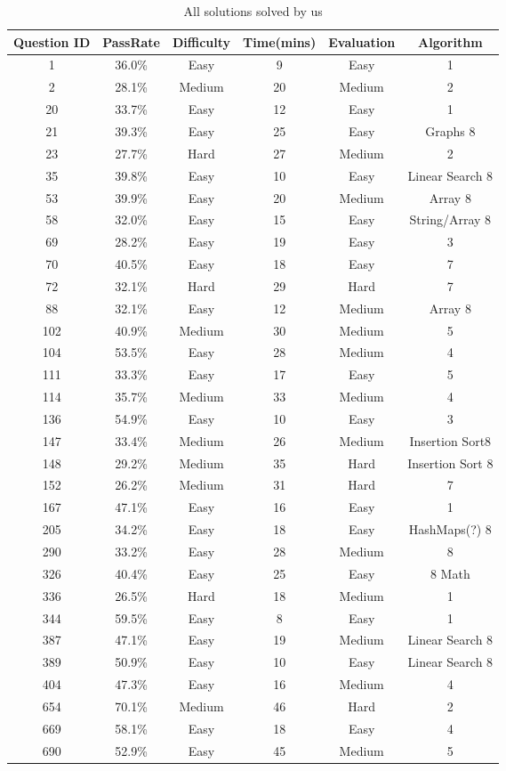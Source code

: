 \documentclass[10pt,twocolumn]{IEEEtran}
\begin{document}
\begin{table}[t]
\begin{tabular}{|c| c| c| c| c| c|} \hline
 Question ID & PassRate & Difficulty & Time(mins) &Evaluation &Algorithm \\
	 \hline
 	1 & 36.0\% & Easy & 9 & Easy & 1\\ 
 	\hline
	 2 & 28.1\% & Medium & 20 &Medium& 2\\
 	\hline
	 20 & 33.7\% & Easy & 12&Easy& 1 \\
 	\hline
 	21 & 39.3\% & Easy & 25&Easy& Graphs 8 \\
 	\hline
 	23 & 27.7\% & Hard & 27&Medium&2 \\
  	\hline
 	35 &39.8\%  & Easy & 10 &Easy&Linear Search 8\\
  	\hline
 	53 &39.9\%  & Easy & 20 &Medium&Array 8\\
  	\hline
 	58 & 32.0\% & Easy & 15 &Easy&String/Array 8\\
  	\hline
 	69 & 28.2\% & Easy & 19 &Easy&3\\
  	\hline
 	70 & 40.5\% & Easy & 18 &Easy&7\\
 	\hline
 	72 & 32.1\% & Hard & 29 &Hard&7\\
  	\hline
 	88 & 32.1\% & Easy & 12 &Medium&Array 8\\
  	\hline
 	102 & 40.9\% &  Medium & 30  &Medium & 5\\
  	\hline
	104 & 53.5\% &Easy  &28  &Medium& 4\\
  	\hline
 	111 &  33.3\%& Easy&17  &Easy& 5\\
  	\hline
 	114 & 35.7\% &Medium  & 33  &Medium&4\\
  	\hline
 	136 &54.9\%  &Easy  &10  &Easy& 3\\
  	\hline
 	147 & 33.4\% &Medium  &26  &Medium&Insertion Sort8\\
  	\hline
 	148 &  29.2\%& Medium & 35 &Hard&Insertion Sort 8\\
	\hline
 	152 &  26.2\%& Medium & 31 &Hard&7\\
  	\hline
  	167 & 47.1\% &Easy  &16  &Easy&1\\
  	\hline
  	205 & 34.2\% &Easy  &18  &Easy&HashMaps(?) 8\\
  	\hline
 	290 & 33.2\% &Easy  &28  &Medium&8\\
  	\hline
 	326 & 40.4\% &Easy  &25  &Easy&8 Math\\
   	\hline
  	336 & 26.5\% &Hard &18  &Medium&1\\
  	\hline
 	344 & 59.5\% &Easy  &8  &Easy&1\\
  	\hline
 	387 & 47.1\% &Easy  & 19 &Medium&Linear Search 8\\
  	\hline
 	389 & 50.9\% &Easy  & 10 &Easy&Linear Search 8\\
  	\hline
 	404 & 47.3\% &Easy  &16  &Medium&4\\
  	\hline
 	654 & 70.1\% &Medium  &46  &Hard&2\\
  	\hline
	669 &  58.1\%& Easy &18  &Easy&4\\
  	\hline
 	690 &  52.9\%& Easy &   45&Medium&5\\[1ex]
 	\hline
\end{tabular}
\caption{All solutions solved by us}
\label{tab:tabSols}
\end{table}
\end{document}
